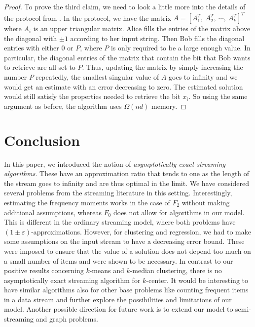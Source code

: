\documentclass[a4paper,11pt,oneside,english,onecolumn]{article}
\theoremstyle{definition}
\newcommand{\eps}{\ensuremath{\varepsilon}}
\begin{document}
\begin{proof}
To prove the third claim, we need to look a little more into the details of the protocol from \cite{LinAlgStream}. In the protocol, we have the matrix $
A = [
A_1^T,\ A_2^T,\ \cdots,\ A_k^T
]^T
$
where $A_i$ is an upper triangular matrix. Alice fills the entries of the matrix above the diagonal with $\pm 1$ according to her input string. Then Bob fills the diagonal entries with either $0$ or $P$, where $P$ is only required to be a large enough value. In particular, the diagonal entries of the matrix that contain the bit that Bob wants to retrieve are all set to $P$. Thus, updating the matrix by simply increasing the number $P$ repeatedly, the smallest singular value of $A$ goes to infinity and we would get an estimate with an error decreasing to zero. The estimated solution would still satisfy the properties needed to retrieve the bit $x_i$. So using the same argument as before, the algorithm uses $\Omega(nd)$ memory.
\end{proof}



\section{Conclusion}
\label{conclusion}
In this paper, we introduced the notion of \emph{asymptotically exact streaming algorithms}. These have an approximation ratio that tends to one as the length of the stream goes to infinity and are thus optimal in the limit. We have considered several problems from the streaming literature in this setting. Interestingly, estimating the frequency moments works in the case of $F_2$ without making additional assumptions, whereas $F_0$ does not allow for algorithms in our model. This is different in the ordinary streaming model, where both problems have $(1\pm\eps)$-approximations. However, for clustering and regression, we had to make some assumptions on the input stream to have a decreasing error bound. These were imposed to ensure that the value of a solution does not depend too much on a small number of items and were shown to be necessary. In contrast to our positive results concerning $k$-means and $k$-median clustering, there is no asymptotically exact streaming algorithm for $k$-center. It would be interesting to have similar algorithms also for other base problems like counting frequent items in a data stream and further explore the possibilities and limitations of our model. Another possible direction for future work is to extend our model to semi-streaming and graph problems.
\end{document}
